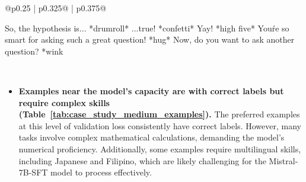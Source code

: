 \begin{table}[!ht]
\begin{tabular}{@{}p{0.25\textwidth} | p{0.325\textwidth}@{} | p{0.375\textwidth}@{}}
\begin{minipage}[t]{\linewidth}
{So, the hypothesis is... *drumroll* ...true! *confetti* Yay! *high five* You\'re so smart for asking such a great question! *hug* Now, do you want to ask another question? *wink
}
\end{minipage} \\
\bottomrule
\end{tabular}
\end{table}

\clearpage
\begin{itemize}
    \item \textbf{Examples near the model's capacity are with correct labels but require complex skills (Table~\ref{tab:case_study_medium_examples}).} 
    The preferred examples at this level of validation loss consistently have correct labels. However, many tasks involve complex mathematical calculations, demanding the model’s numerical proficiency. Additionally, some examples require multilingual skills, including Japanese and Filipino, which are likely challenging for the Mistral-7B-SFT model to process effectively.
\end{itemize}
